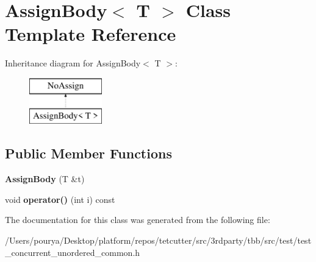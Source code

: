 \hypertarget{classAssignBody}{}\section{Assign\+Body$<$ T $>$ Class Template Reference}
\label{classAssignBody}
Inheritance diagram for Assign\+Body$<$ T $>$\+:\begin{figure}[H]
\begin{center}
\leavevmode
\includegraphics[height=2.000000cm]{classAssignBody}
\end{center}
\end{figure}
\subsection*{Public Member Functions}
\begin{DoxyCompactItemize}
\item 
\hypertarget{classAssignBody_abf0bbec7910ca83823d72144fe3dc1fd}{}{\bfseries Assign\+Body} (T \&t)\label{classAssignBody_abf0bbec7910ca83823d72144fe3dc1fd}

\item 
\hypertarget{classAssignBody_a26102bd4f5c3f08b5049db1b85ff382c}{}void {\bfseries operator()} (int i) const \label{classAssignBody_a26102bd4f5c3f08b5049db1b85ff382c}

\end{DoxyCompactItemize}


The documentation for this class was generated from the following file\+:\begin{DoxyCompactItemize}
\item 
/\+Users/pourya/\+Desktop/platform/repos/tetcutter/src/3rdparty/tbb/src/test/test\+\_\+concurrent\+\_\+unordered\+\_\+common.\+h\end{DoxyCompactItemize}
